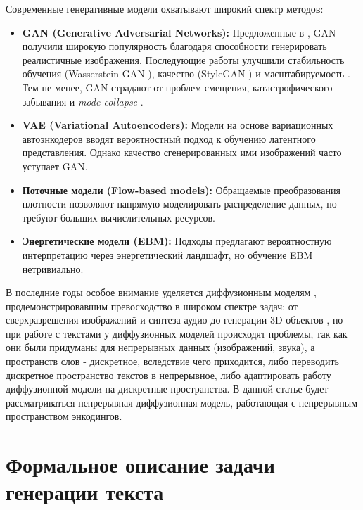 \documentclass[12pt,a4paper]{article}
\begin{document}
Современные генеративные модели охватывают широкий спектр методов:
\begin{itemize}
    \item \textbf{GAN (Generative Adversarial Networks):} Предложенные в \cite{goodfellow2014generative}, GAN получили широкую популярность благодаря способности генерировать реалистичные изображения. Последующие работы улучшили стабильность обучения (Wasserstein GAN \cite{arjovsky2017wasserstein,gulrajani2017improved}), качество (StyleGAN \cite{karras2019style,karras2021alias}) и масштабируемость \cite{brock2018large}. Тем не менее, GAN страдают от проблем смещения, катастрофического забывания и \emph{mode collapse} \cite{zhao2018bias,thanh2020catastrophic}.
    \item \textbf{VAE (Variational Autoencoders):} Модели на основе вариационных автоэнкодеров \cite{kingma2013auto,rezende2014stochastic} вводят вероятностный подход к обучению латентного представления. Однако качество сгенерированных ими изображений часто уступает GAN.
    \item \textbf{Поточные модели (Flow-based models):} Обращаемые преобразования плотности \cite{grathwohl2018ffjord,chen2019residual} позволяют напрямую моделировать распределение данных, но требуют больших вычислительных ресурсов.
    \item \textbf{Энергетические модели (EBM):} Подходы \cite{xiao2020vaebm} предлагают вероятностную интерпретацию через энергетический ландшафт, но обучение EBM нетривиально.
\end{itemize}

В последние годы особое внимание уделяется диффузионным моделям \cite{ho2020denoising,sohl2015deep,song2019generative,song2020improved,song2020denoising,song2020score,nichol2021improved,dhariwal2021diffusion,kingma2021variational}, продемонстрировавшим превосходство в широком спектре задач: от сверхразрешения изображений \cite{saharia2021image} и синтеза аудио \cite{popov2021grad,liu2022diffgan} до генерации 3D-объектов \cite{luo2021diffusion,zhou20213d}, но при работе с текстами у диффузионных моделей происходят проблемы, так как они были придуманы для непрерывных данных (изображений, звука), а пространств слов - дискретное, вследствие чего приходится, либо переводить дискретное пространство текстов в непрерывное, либо адаптировать работу диффузионной модели на дискретные пространства.
В данной статье будет рассматриваться непрерывная диффузионная модель, работающая с непрерывным пространством энкодингов.

\section{Формальное описание задачи генерации текста}
\end{document}
